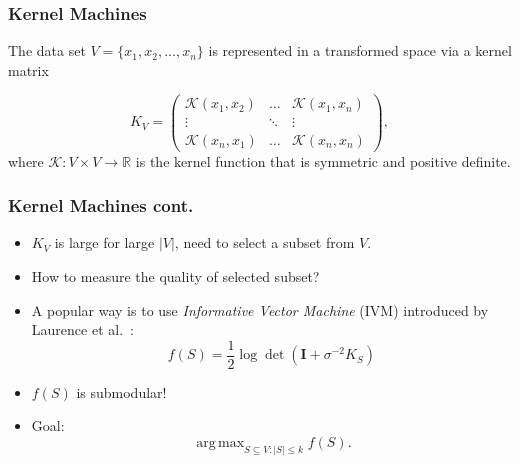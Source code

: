 \documentclass{beamer}
\newcommand{\calK}{\mathcal{K}}
\newcommand{\bbR}{\mathbb{R}}
\DeclareMathOperator*{\argmax}{arg\,max}
\begin{document}
\begin{frame}
\frametitle{Kernel Machines}
The data set $V = \{x_1, x_2, \ldots, x_n\}$ is represented in a transformed space via a kernel matrix

\[ K_V = \left( \begin{array}{ccc}
\calK(x_1, x_2) & \ldots & \calK(x_1, x_n) \\
\vdots & \ddots & \vdots \\
\calK(x_n,x_1) & \ldots & \calK(x_n, x_n) \end{array} \right),\] 
where $\calK: V\times V \rightarrow \bbR$ is the kernel function that is symmetric and positive definite. 
\end{frame}

\begin{frame}
  \frametitle{Kernel Machines cont.}
  \begin{itemize}
  \item   $K_V$ is large for large $|V|$, need to select a subset from $V$.
  \item   How to measure the quality of selected subset?
  \item A popular way is to use \emph{Informative Vector Machine} (IVM) introduced by Laurence et al.\ \cite{LSH03}:
    $$f(S) = \frac{1}{2} \log\det\left( \mathbf{I} + \sigma^{-2} K_S \right)$$
   \item $f(S)$ is submodular!
   \item Goal: $$\argmax_{S\subseteq V : |S| \leq k} f(S).$$
  \end{itemize}

\end{frame}










\end{document}
